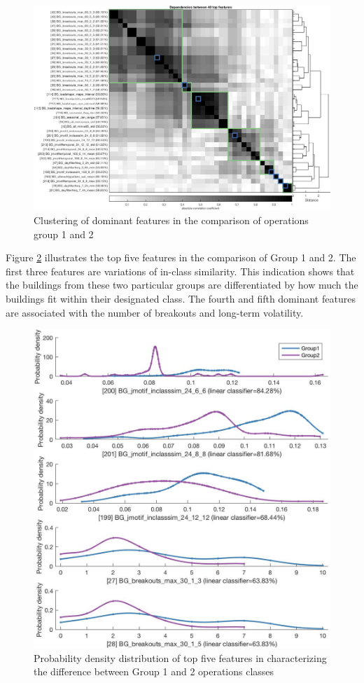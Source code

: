 \begin{figure}[ht!]
\begin{center}
\includegraphics[width=1\columnwidth]{figures/Output_Group1vsGroup2_Top40/Output_Group1vsGroup2_Top40}
\caption{{Clustering of dominant features in the comparison of operations group 1 and 2
\label{fig:featurecluserting_operationsgroups}%
}}
\end{center}
\end{figure}

Figure \ref{fig:topfivefeatures_operationsclass} illustrates the top five features in the comparison of Group 1 and 2. The first three features are variations of in-class similarity. This indication shows that the buildings from these two particular groups are differentiated by how much the buildings fit within their designated class. The fourth and fifth dominant features are associated with the number of breakouts and long-term volatility.

\begin{figure}[ht!]
\begin{center}
\includegraphics[width=0.7\columnwidth]{figures/Output_Group1vsGroup2_Features_1-5/Output_Group1vsGroup2_Features_1-5}
\caption{{Probability density distribution of top five features in characterizing the difference between Group 1 and 2 operations classes
\label{fig:topfivefeatures_operationsclass}%
}}
\end{center}
\end{figure}


